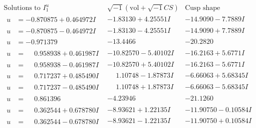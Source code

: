\documentclass[1p]{elsarticle_modified}
\theoremstyle{definition}
\newcommand{\I}{\sqrt{-1}}
\begin{document}
$$\begin{array}{c|c|c}  
\text{Solutions to }I^u_{1}& \I (\text{vol} + \sqrt{-1}CS) & \text{Cusp shape}\\
 \hline 
\begin{aligned}
u &= -0.870875 + 0.464972 I\end{aligned}
 & -1.83130 + 4.25551 I & -14.9090 - 7.7889 I \\ \hline\begin{aligned}
u &= -0.870875 - 0.464972 I\end{aligned}
 & -1.83130 - 4.25551 I & -14.9090 + 7.7889 I \\ \hline\begin{aligned}
u &= -0.971379\phantom{ +0.000000I}\end{aligned}
 & -13.4466\phantom{ +0.000000I} & -20.2820\phantom{ +0.000000I} \\ \hline\begin{aligned}
u &= \phantom{-}0.958938 + 0.461987 I\end{aligned}
 & -10.82570 - 5.40102 I & -16.2163 + 5.6771 I \\ \hline\begin{aligned}
u &= \phantom{-}0.958938 - 0.461987 I\end{aligned}
 & -10.82570 + 5.40102 I & -16.2163 - 5.6771 I \\ \hline\begin{aligned}
u &= \phantom{-}0.717237 + 0.485490 I\end{aligned}
 & \phantom{-}1.10748 - 1.87873 I & -6.66063 + 5.68345 I \\ \hline\begin{aligned}
u &= \phantom{-}0.717237 - 0.485490 I\end{aligned}
 & \phantom{-}1.10748 + 1.87873 I & -6.66063 - 5.68345 I \\ \hline\begin{aligned}
u &= \phantom{-}0.861396\phantom{ +0.000000I}\end{aligned}
 & -4.23946\phantom{ +0.000000I} & -21.1260\phantom{ +0.000000I} \\ \hline\begin{aligned}
u &= \phantom{-}0.362544 + 0.678780 I\end{aligned}
 & -8.93621 + 1.22135 I & -11.90750 - 0.10584 I \\ \hline\begin{aligned}
u &= \phantom{-}0.362544 - 0.678780 I\end{aligned}
 & -8.93621 - 1.22135 I & -11.90750 + 0.10584 I \\ \hline\begin{aligned}

\end{aligned}
\end{array}$$
\end{document}
